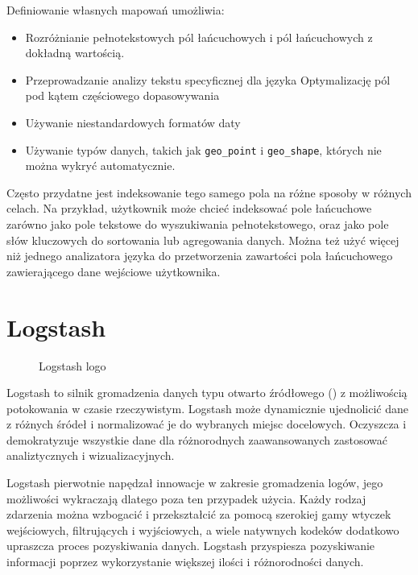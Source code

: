 Definiowanie własnych mapowań umożliwia:

\begin{itemize}
    \item Rozróżnianie pełnotekstowych pól łańcuchowych i pól łańcuchowych z dokładną wartością.
    \item Przeprowadzanie analizy tekstu specyficznej dla języka
    Optymalizację pól pod kątem częściowego dopasowywania
    \item Używanie niestandardowych formatów daty
    \item Używanie typów danych, takich jak \verb|geo_point| i \verb|geo_shape|, których nie można wykryć automatycznie.
\end{itemize}

Często przydatne jest indeksowanie tego samego pola na różne sposoby w różnych celach. Na przykład, użytkownik może chcieć indeksować pole łańcuchowe zarówno jako pole tekstowe do wyszukiwania pełnotekstowego, oraz jako pole słów kluczowych do sortowania lub agregowania danych. Można też użyć więcej niż jednego analizatora języka do przetworzenia zawartości pola łańcuchowego zawierającego dane wejściowe użytkownika\cite{elasticSearchManualDataIn}.

\section{Logstash}

\begin{figure}[!htbp]
    \centering
    
    \caption{Logstash logo\cite{logstashMain}}
    \label{fig:enter-label}
\end{figure}

Logstash to silnik gromadzenia danych typu otwarto źródłowego () z możliwością potokowania w czasie rzeczywistym. Logstash może dynamicznie ujednolicić dane z różnych śródeł i normalizować je do wybranych miejsc docelowych. Oczyszcza i demokratyzuje wszystkie dane dla różnorodnych zaawansowanych zastosować analiztycznych i wizualizacyjnych\cite{logstashManualIntroduction}.

Logstash pierwotnie napędzał innowacje w zakresie gromadzenia logów, jego możliwości wykraczają dlatego poza ten przypadek użycia. Każdy rodzaj zdarzenia można wzbogacić i przekształcić za pomocą szerokiej gamy wtyczek wejściowych, filtrujących i wyjściowych, a wiele natywnych kodeków dodatkowo upraszcza proces pozyskiwania danych. Logstash przyspiesza pozyskiwanie informacji poprzez wykorzystanie większej ilości i różnorodności danych\cite{logstashManualIntroduction}.

